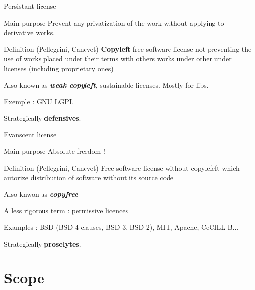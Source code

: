 \documentclass{beamer}
\begin{document}
\begin{frame}{Persistant license}

\begin{block}{Main purpose}
    Prevent any privatization of the work without applying to derivative works.
  \end{block}

  \begin{alertblock}{Definition (Pellegrini, Canevet)}
    \textbf{Copyleft} free software license not preventing the use of works placed under their terms with others works under other under licenses (including proprietary ones)
   \end{alertblock}

Also known as \textit{\textbf{weak copyleft}}, sustainable licenses. Mostly for libs.
 
Exemple : GNU LGPL

Strategically \textbf{defensives}.

\end{frame}

\begin{frame}{Evanscent license}

  \begin{block}{Main purpose}
    Absolute freedom !
  \end{block}

  \begin{alertblock}{Definition (Pellegrini, Canevet)}
    Free software license without copylefeft which autorize distribution of software without its source code
   \end{alertblock}

Also knwon as \textit{\textbf{copyfree}}

A less rigorous term : permissive licences 

Examples : BSD (BSD 4 clauses, BSD 3, BSD 2), MIT, Apache, CeCILL-B... 

Strategically \textbf{proselytes}.

\end{frame}


\section{Scope}
\end{document}
